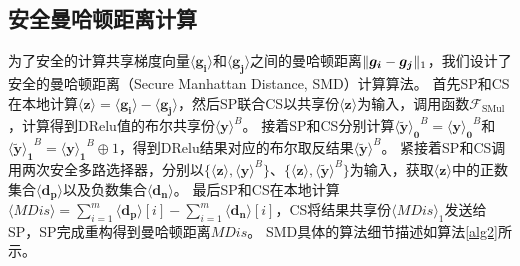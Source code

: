 \subsection{安全曼哈顿距离计算}
为了安全的计算共享梯度向量$\boldsymbol{\langle g_i\rangle}$和$\boldsymbol{\langle g_j\rangle}$之间的曼哈顿距离$\Vert \boldsymbol{g_i} - \boldsymbol{g_j}\Vert_1$，我们设计了安全的曼哈顿距离（Secure Manhattan Distance, SMD）计算算法。
首先SP和CS在本地计算$\boldsymbol{\langle z\rangle} = \boldsymbol{\langle g_i\rangle} - \boldsymbol{\langle g_j\rangle}$，然后SP联合CS以共享份$\boldsymbol{\langle z\rangle}$为输入，调用函数$\mathcal{F}_{\text {SMul}}$，计算得到DRelu值的布尔共享份$\boldsymbol{\langle y\rangle}^{B}$。
接着SP和CS分别计算$\boldsymbol{\langle \widetilde{y} \rangle_0}^{B} = \boldsymbol{\langle y\rangle_0}^{B}$和$\boldsymbol{\langle \widetilde{y} \rangle_1}^{B} = \boldsymbol{\langle y\rangle_1}^{B} \oplus 1$，得到DRelu结果对应的布尔取反结果$\boldsymbol{\langle \widetilde{y} \rangle}^{B}$。
紧接着SP和CS调用两次安全多路选择器，分别以$\{\boldsymbol{\langle z\rangle}, \boldsymbol{\langle y\rangle}^{B}\}$、$\{\boldsymbol{\langle z\rangle}, \boldsymbol{\langle \widetilde{y}\rangle}^{B}\}$为输入，获取$\boldsymbol{\langle z\rangle}$中的正数集合$\boldsymbol{
	\langle d_p\rangle}$以及负数集合$\boldsymbol{
	\langle d_n\rangle}$。
最后SP和CS在本地计算$\langle \textit{MDis}\rangle = \sum_{i=1}^{m}\boldsymbol{\langle d_p\rangle}[i] - \sum_{i=1}^{m}\boldsymbol{\langle d_n\rangle}[i]$，CS将结果共享份$\langle \textit{MDis}\rangle_1$发送给SP，SP完成重构得到曼哈顿距离$\textit{MDis}$。
SMD具体的算法细节描述如算法\ref{alg2}所示。

